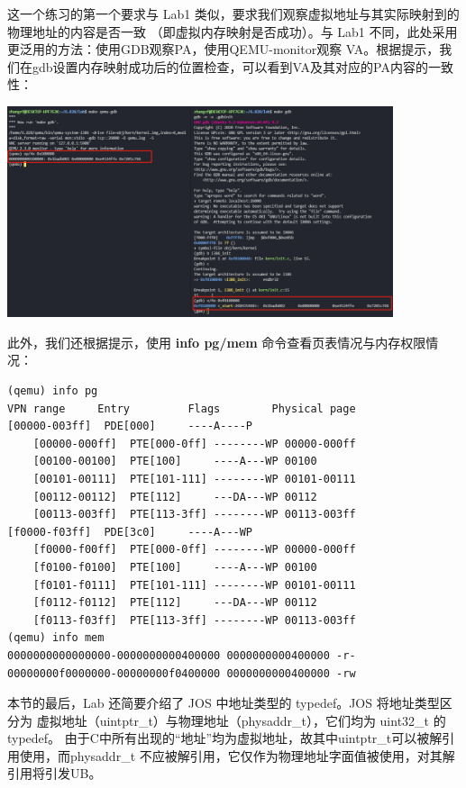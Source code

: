 \documentclass[12pt, letterpaper]{report}
\begin{document}
\quad \par
这一个练习的第一个要求与 Lab1 类似，要求我们观察虚拟地址与其实际映射到的物理地址的内容是否一致
（即虚拟内存映射是否成功）。与 Lab1 不同，此处采用更泛用的方法：使用GDB观察PA，使用QEMU-monitor观察
VA。根据提示，我们在gdb设置内存映射成功后的位置检查，可以看到VA及其对应的PA内容的一致性：\par 

\includegraphics[width=0.85\textwidth]{pa_va}

\quad \par 
此外，我们还根据提示，使用 \textbf{info pg/mem} 命令查看页表情况与内存权限情况：\par 
\quad \par 

\lstset{style=AssemblyStyle}
\setmainfont{Consolas}
\begin{lstlisting}
(qemu) info pg
VPN range     Entry         Flags        Physical page
[00000-003ff]  PDE[000]     ----A----P
    [00000-000ff]  PTE[000-0ff] --------WP 00000-000ff
    [00100-00100]  PTE[100]     ----A---WP 00100
    [00101-00111]  PTE[101-111] --------WP 00101-00111
    [00112-00112]  PTE[112]     ---DA---WP 00112
    [00113-003ff]  PTE[113-3ff] --------WP 00113-003ff
[f0000-f03ff]  PDE[3c0]     ----A---WP
    [f0000-f00ff]  PTE[000-0ff] --------WP 00000-000ff
    [f0100-f0100]  PTE[100]     ----A---WP 00100
    [f0101-f0111]  PTE[101-111] --------WP 00101-00111
    [f0112-f0112]  PTE[112]     ---DA---WP 00112
    [f0113-f03ff]  PTE[113-3ff] --------WP 00113-003ff
(qemu) info mem
0000000000000000-0000000000400000 0000000000400000 -r-
00000000f0000000-00000000f0400000 0000000000400000 -rw
\end{lstlisting}
\setmainfont{Times New Roman}
\quad \par

本节的最后，Lab 还简要介绍了 JOS 中地址类型的 typedef。JOS 将地址类型区分为
虚拟地址（uintptr\_t）与物理地址（physaddr\_t），它们均为 uint32\_t 的typedef。
由于C中所有出现的“地址”均为虚拟地址，故其中uintptr\_t可以被解引用使用，而physaddr\_t
不应被解引用，它仅作为物理地址字面值被使用，对其解引用将引发UB。\par 
\end{document}
